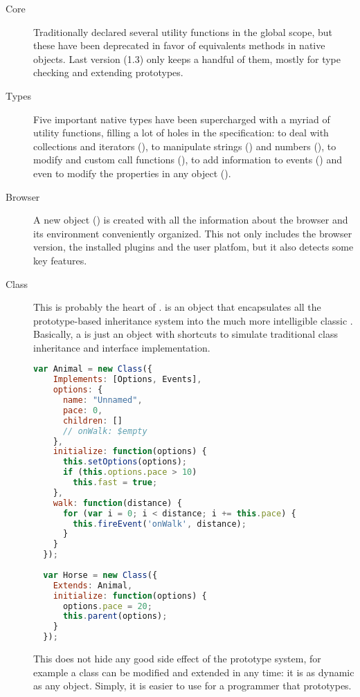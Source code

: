 \begin{description}
  \item[Core] Traditionally  declared several utility functions in the global scope, but these have been deprecated in favor of equivalents methods in native objects.
  Last version (1.3) only keeps a handful of them, mostly for type checking and extending prototypes.
  \item[Types] Five important native types have been supercharged with a myriad of utility functions, filling a lot of holes in the  specification: to deal with collections and iterators (), to manipulate strings () and numbers (), to modify and custom call functions (), to add information to events () and even to modify the properties in any object ().
  \item[Browser] A new object () is created with all the information about the browser and its environment conveniently organized.
  This not only includes the browser version, the installed plugins and the user platfom, but it also detects some key features.
  \item[Class] This is probably the heart of .
   is an object that encapsulates all the prototype-based inheritance system into the much more intelligible classic .
  Basically, a  is just an object with shortcuts to simulate traditional class inheritance and interface implementation.
  
\begin{lstlisting}[language=JavaScript,label=mootoolsclass,caption=MooTools class definitions]
  var Animal = new Class({
    Implements: [Options, Events],
    options: {
      name: "Unnamed",
      pace: 0,
      children: []
      // onWalk: $empty
    },
    initialize: function(options) {
      this.setOptions(options);
      if (this.options.pace > 10)
        this.fast = true;
    },
    walk: function(distance) {
      for (var i = 0; i < distance; i += this.pace) {
        this.fireEvent('onWalk', distance);
      }
    }
  });
  
  var Horse = new Class({
    Extends: Animal,
    initialize: function(options) {
      options.pace = 20;
      this.parent(options);
    }
  });
\end{lstlisting}
  
  This does not hide any good side effect of the prototype system, for example a class can be modified and extended in any time: it is as dynamic as any  object.
  Simply, it is easier to use for a programmer that prototypes.
  

\end{description}
